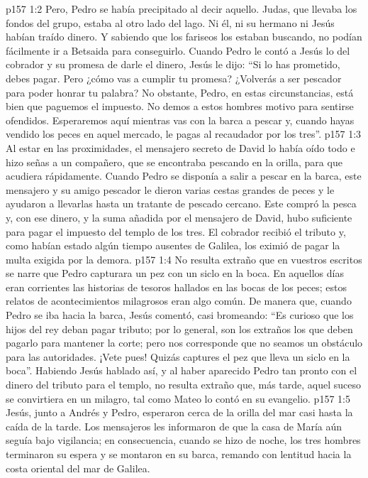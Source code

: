 \vs p157 1:2 Pero, Pedro se había precipitado al decir aquello. Judas, que llevaba los fondos del grupo, estaba al otro lado del lago. Ni él, ni su hermano ni Jesús habían traído dinero. Y sabiendo que los fariseos los estaban buscando, no podían fácilmente ir a Betsaida para conseguirlo. Cuando Pedro le contó a Jesús lo del cobrador y su promesa de darle el dinero, Jesús le dijo: “Si lo has prometido, debes pagar. Pero ¿cómo vas a cumplir tu promesa? ¿Volverás a ser pescador para poder honrar tu palabra? No obstante, Pedro, en estas circunstancias, está bien que paguemos el impuesto. No demos a estos hombres motivo para sentirse ofendidos. Esperaremos aquí mientras vas con la barca a pescar y, cuando hayas vendido los peces en aquel mercado, le pagas al recaudador por los tres”.
\vs p157 1:3 Al estar en las proximidades, el mensajero secreto de David lo había oído todo e hizo señas a un compañero, que se encontraba pescando en la orilla, para que acudiera rápidamente. Cuando Pedro se disponía a salir a pescar en la barca, este mensajero y su amigo pescador le dieron varias cestas grandes de peces y le ayudaron a llevarlas hasta un tratante de pescado cercano. Este compró la pesca y, con ese dinero, y la suma añadida por el mensajero de David, hubo suficiente para pagar el impuesto del templo de los tres. El cobrador recibió el tributo y, como habían estado algún tiempo ausentes de Galilea, los eximió de pagar la multa exigida por la demora.
\vs p157 1:4 No resulta extraño que en vuestros escritos se narre que Pedro capturara un pez con un siclo en la boca. En aquellos días eran corrientes las historias de tesoros hallados en las bocas de los peces; estos relatos de acontecimientos milagrosos eran algo común. De manera que, cuando Pedro se iba hacia la barca, Jesús comentó, casi bromeando: “Es curioso que los hijos del rey deban pagar tributo; por lo general, son los extraños los que deben pagarlo para mantener la corte; pero nos corresponde que no seamos un obstáculo para las autoridades. ¡Vete pues! Quizás captures el pez que lleva un siclo en la boca”. Habiendo Jesús hablado así, y al haber aparecido Pedro tan pronto con el dinero del tributo para el templo, no resulta extraño que, más tarde, aquel suceso se convirtiera en un milagro, tal como Mateo lo contó en su evangelio.
\vs p157 1:5 Jesús, junto a Andrés y Pedro, esperaron cerca de la orilla del mar casi hasta la caída de la tarde. Los mensajeros les informaron de que la casa de María aún seguía bajo vigilancia; en consecuencia, cuando se hizo de noche, los tres hombres terminaron su espera y se montaron en su barca, remando con lentitud hacia la costa oriental del mar de Galilea.
